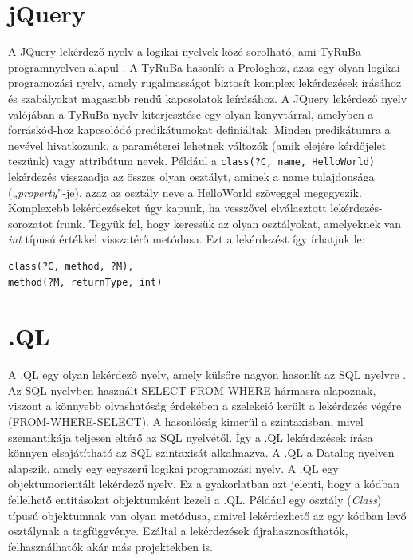 \documentclass[a4paper,12pt]{report}
\begin{document}
\section{jQuery}
A JQuery lekérdező nyelv a logikai nyelvek közé sorolható, ami TyRuBa programnyelven alapul \cite{jquery}. A TyRuBa hasonlít a Prologhoz, azaz egy olyan logikai programozási nyelv, amely rugalmasságot biztosít komplex lekérdezések írásához és szabályokat magasabb rendű kapcsolatok leírásához. A JQuery lekérdező nyelv valójában a TyRuBa nyelv kiterjesztése egy olyan könyvtárral, amelyben a forráskód-hoz kapcsolódó predikátumokat definiáltak. Minden predikátumra a nevével hivatkozunk, a paraméterei lehetnek változók (amik elejére kérdőjelet teszünk) vagy attribútum nevek. Például a \texttt{class(?C, name, HelloWorld)} lekérdezés visszaadja az összes olyan osztályt, aminek a name tulajdonsága („\textit{property}”-je), azaz az osztály neve a HelloWorld szöveggel megegyezik. Komplexebb lekérdezéseket úgy kapunk, ha vesszővel elválasztott lekérdezés-sorozatot írunk. Tegyük fel, hogy keressük az olyan osztályokat, amelyeknek van \textit{int} típusú értékkel visszatérő metódusa. Ezt a lekérdezést így írhatjuk le:

\begin{verbatim}
class(?C, method, ?M),
method(?M, returnType, int)
\end{verbatim}

\section{.QL}
A .QL egy olyan lekérdező nyelv, amely külsőre nagyon hasonlít az SQL nyelvre \cite{dotql}. Az SQL nyelvben használt SELECT-FROM-WHERE hármasra alapoznak, viszont a könnyebb olvashatóság érdekében a szelekció került a lekérdezés végére (FROM-WHERE-SELECT). A hasonlóság kimerül a szintaxisban, mivel szemantikája teljesen eltérő az SQL nyelvétől. Így a .QL lekérdezések írása könnyen elsajátítható az SQL szintaxisát alkalmazva. A .QL a Datalog nyelven alapszik, amely egy egyszerű logikai programozási nyelv. A .QL egy objektumorientált lekérdező nyelv. Ez a gyakorlatban azt jelenti, hogy a kódban fellelhető entitásokat objektumként kezeli a .QL. Például egy osztály (\textit{Class}) típusú objektumnak van olyan metódusa, amivel lekérdezhető az egy kódban levő osztálynak a tagfüggvénye. Ezáltal a lekérdezések újrahasznosíthatók, felhasználhatók akár más projektekben is.
\end{document}
